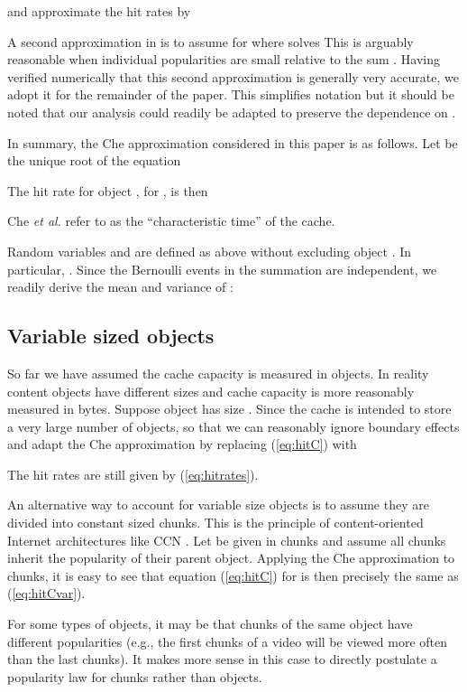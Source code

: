 \documentclass{amsart}
\def\etal{{\em et al. }}
\begin{document}
and approximate the hit rates by


A second approximation in \cite{CTW02} is to assume   for  where  solves  This is arguably reasonable when individual popularities  are small relative to the sum . Having verified numerically that this second approximation is generally very accurate, we adopt it for the remainder of the paper. This simplifies notation but it should be noted that our analysis could readily be adapted to preserve the dependence on .

In summary, the Che approximation considered in this paper is as follows. Let   be the unique root of the equation

The hit rate  for object , for , is then 

Che \etal  refer to  as the ``characteristic time'' of the cache.



Random variables  and  are defined as above without excluding object . In particular, . Since the Bernoulli events in the summation are independent, we readily derive the mean and variance of :




 \subsection{Variable sized objects}
 \label{sec:varsize}
 
So far we have assumed the cache capacity is measured in objects. In reality content objects have different sizes and cache capacity is more reasonably measured in bytes. Suppose object  has size . Since the cache is intended to store a very large number of objects,  so that we can reasonably ignore boundary effects and adapt the Che approximation by replacing (\ref{eq:hitC}) with

The hit rates are still given by (\ref{eq:hitrates}).

An alternative way to account for variable size objects is to assume they are divided into constant sized chunks. This is the principle of content-oriented Internet architectures like CCN \cite{JSTP09}. Let  be given in chunks and assume all chunks inherit the popularity  of their parent object. Applying the Che approximation to chunks, it is easy to see that equation (\ref{eq:hitC}) for  is then precisely the same as (\ref{eq:hitCvar}).

For some types of objects, it may be that chunks of the same object have different popularities (e.g., the first chunks of a video will be viewed more often than the last chunks). It makes more sense in this case to directly postulate a popularity law for chunks rather than objects. 
\end{document}
